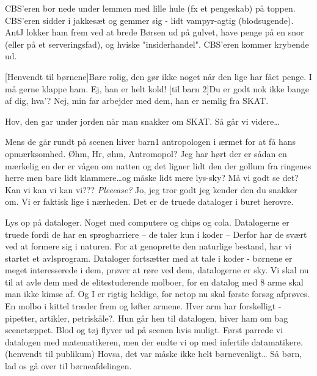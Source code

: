 \documentclass[a4paper,12pt]{article}
\begin{document}
\begin{sketch}
\scene CBS'eren bor nede under lemmen med lille hule (fx et pengeskab) på toppen. CBS'eren sidder i jakkesæt og gemmer sig - lidt vampyr-agtig (blodsugende). AntJ lokker ham frem ved at brede Børsen ud på gulvet, have penge på en snor (eller på et serveringsfad), og hviske "insiderhandel". CBS'eren kommer krybende ud.

[Henvendt til børnene]Bare rolig, den gør ikke noget når den lige har fået penge. I må gerne klappe ham.
Ej, han er helt kold!
[til barn 2]Du er godt nok ikke bange af dig, hva'?
Nej, min far arbejder med dem, han er nemlig fra SKAT.

Hov, den gar under jorden når man snakker om SKAT. Så går vi videre\ldots

\scene Mens de går rundt på scenen hiver barn1 antropologen i ærmet for at få hans opmærksomhed.
Øhm, Hr, øhm, Antromopol? Jeg har hørt der er sådan en mærkelig en der er vågen om natten og det ligner lidt den der gollum fra ringenes herre men bare lidt klammere\ldots og måske lidt mere lys-sky? Må vi godt se det? Kan vi kan vi kan vi??? \emph{Pleeease?}
Jo, jeg tror godt jeg kender den du snakker om. Vi er faktisk lige i nærheden. Det er de truede dataloger i buret herovre.

\scene Lys op på dataloger. Noget med computere og chips og cola.
Datalogerne er truede fordi de har en sprogbarriere -- de taler kun i koder --
Derfor har de svært ved at formere sig i naturen. For at genoprette den naturlige bestand, har vi startet et avlsprogram.
\scene Dataloger fortsætter med at tale i koder - børnene er meget interesserede i dem, prøver at røre ved dem, datalogerne er sky.
Vi skal nu til at avle dem med de elitestuderende molboer, for en datalog med 8 arme skal man ikke kimse af. Og I er rigtig heldige, for netop nu skal første forsøg afprøves.
\scene En molbo i kittel træder frem og løfter armene. Hver arm har forskelligt - pipetter, artikler, petriskåle?. Hun går hen til datalogen, hiver ham om bag scenetæppet. Blod og tøj flyver ud på scenen hvis muligt.
 Først parrede vi datalogen med matematikeren, men der endte vi op med infertile datamatikere.
(henvendt til publikum) Hovsa, det var måske ikke helt børnevenligt\ldots
{}Så børn, lad os gå over til børneafdelingen.


\end{sketch}
\end{document}
